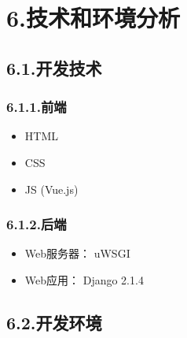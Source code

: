\documentclass{article}
\begin{document}
\section{6.\hspace*{0.5em}技术和环境分析}\label{6}%

\subsection{6.1.\hspace*{0.5em}开发技术}\label{61}%

\subsubsection{6.1.1.\hspace*{0.5em}前端}\label{611}%

\begin{itemize}[noitemsep,topsep=\mdcompacttopsep]%

\item{}HTML%

\item{}CSS%

\item{}JS (Vue.js)%
\end{itemize}%

\subsubsection{6.1.2.\hspace*{0.5em}后端}\label{612}%

\begin{itemize}[noitemsep,topsep=\mdcompacttopsep]%

\item{}Web服务器： uWSGI%

\item{}Web应用： Django 2.1.4%
\end{itemize}%

\subsection{6.2.\hspace*{0.5em}开发环境}\label{62}%
\end{document}

